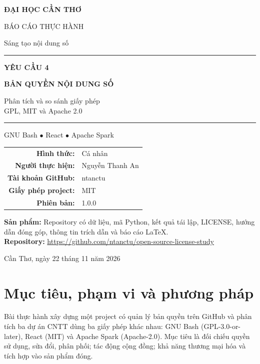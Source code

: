 \documentclass[12pt,a4paper]{article}
\begin{document}
\begin{titlepage}
\centering
{\large\bfseries ĐẠI HỌC CẦN THƠ\par}
\vspace{0.5cm}
{\large BÁO CÁO THỰC HÀNH\par}
{\normalsize Sáng tạo nội dung số\par}
\vspace{1.8cm}
{\color{navy}\rule{\textwidth}{1.3pt}\par}
\vspace{0.5cm}
{\LARGE\bfseries YÊU CẦU 4\par}
\vspace{0.35cm}
{\LARGE\bfseries BẢN QUYỀN NỘI DUNG SỐ\par}
\vspace{0.55cm}
{\Large Phân tích và so sánh giấy phép\\GPL, MIT và Apache 2.0\par}
\vspace{0.5cm}
{\color{navy}\rule{\textwidth}{1.3pt}\par}
\vspace{1cm}
{\large GNU Bash \quad $\bullet$ \quad React \quad $\bullet$ \quad Apache Spark\par}
\vspace{1.1cm}
\begin{tabular}{rl}
\textbf{Hình thức:} & Cá nhân\\
\textbf{Người thực hiện:} & Nguyễn Thanh An\\
\textbf{Tài khoản GitHub:} & ntanctu\\
\textbf{Giấy phép project:} & MIT\\
\textbf{Phiên bản:} & 1.0.0
\end{tabular}
\vfill
\begin{minipage}{0.96\textwidth}
\small\textbf{Sản phẩm:} Repository có dữ liệu, mã Python, kết quả tái lập, LICENSE, hướng dẫn đóng góp, thông tin trích dẫn và báo cáo LaTeX.\\[4pt]
\textbf{Repository:} \url{https://github.com/ntanctu/open-source-license-study}
\end{minipage}
\vspace{0.7cm}
{\large Cần Thơ, ngày 22 tháng 11 năm 2026\par}
\end{titlepage}

\section{Mục tiêu, phạm vi và phương pháp}
Bài thực hành xây dựng một project có quản lý bản quyền trên GitHub và phân tích ba dự án CNTT dùng ba giấy phép khác nhau: GNU Bash (GPL-3.0-or-later), React (MIT) và Apache Spark (Apache-2.0). Mục tiêu là đối chiếu quyền sử dụng, sửa đổi, phân phối; tác động cộng đồng; khả năng thương mại hóa và tích hợp vào sản phẩm đóng.
\end{document}
